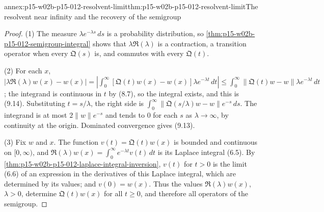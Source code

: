 \begin{annexitem}{annex:p15-w02b-p15-012-resolvent-limit}{thm:p15-w02b-p15-012-resolvent-limit}{The resolvent near infinity and the recovery of the semigroup}
\begin{proof}
(1) The measure \(\lambda e^{-\lambda s}\,ds\) is a probability distribution,
so \cref{thm:p15-w02b-p15-012-semigroup-integral} shows that
\(\lambda\mathfrak R(\lambda)\) is a contraction, a transition operator when
every \(\mathfrak Q(s)\) is, and commutes with every \(\mathfrak Q(t)\).

(2) For each \(x\),
\(|\lambda\mathfrak R(\lambda)w(x)-w(x)|=|\int_0^\infty[\mathfrak Q(t)w(x)-w(x)]\lambda e^{-\lambda t}\,dt|
\leq\int_0^\infty\|\mathfrak Q(t)w-w\|\lambda e^{-\lambda t}\,dt\); the integrand
is continuous in \(t\) by (8.7), so the integral exists, and this is (9.14).
Substituting \(t=s/\lambda\), the right side is
\(\int_0^\infty\|\mathfrak Q(s/\lambda)w-w\|e^{-s}\,ds\). The integrand is at
most \(2\|w\|e^{-s}\) and tends to \(0\) for each \(s\) as \(\lambda\to\infty\),
by continuity at the origin. Dominated convergence gives (9.13).

(3) Fix \(w\) and \(x\). The function \(v(t)=\mathfrak Q(t)w(x)\) is bounded
and continuous on \([0,\infty)\), and
\(\mathfrak R(\lambda)w(x)=\int_0^\infty e^{-\lambda t}v(t)\,dt\) is its Laplace
integral (6.5). By \cref{thm:p15-w02b-p15-012-laplace-integral-inversion},
\(v(t)\) for \(t>0\) is the limit (6.6) of an expression in the derivatives of
this Laplace integral, which are determined by its values; and
\(v(0)=w(x)\). Thus the values \(\mathfrak R(\lambda)w(x)\), \(\lambda>0\),
determine \(\mathfrak Q(t)w(x)\) for all \(t\geq0\), and therefore all
operators of the semigroup.
\end{proof}
\end{annexitem}

